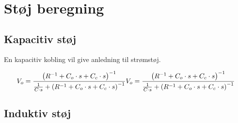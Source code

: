 \documentclass[Softwaredesign/Softwaredesign_main.tex]{subfiles}
\begin{document}
\section{Støj beregning}
\subsection{Kapacitiv støj}
En kapacitiv kobling vil give anledning til strømstøj. 

$$
V_o = \frac{\left( R^{-1} + C_o \cdot s + C_c \cdot s \right)^{-1}}{\frac{1}{C \cdot s} + \left( R^{-1} + C_o \cdot s + C_c \cdot s \right)^{-1}} \\

V_o = \frac{\left( R^{-1} + C_o \cdot s + C_c \cdot s \right)^{-1}}{\frac{1}{C \cdot s} + \left( R^{-1} + C_o \cdot s + C_c \cdot s \right)^{-1}} \\

$$
\subsection{Induktiv støj}
\end{document}
